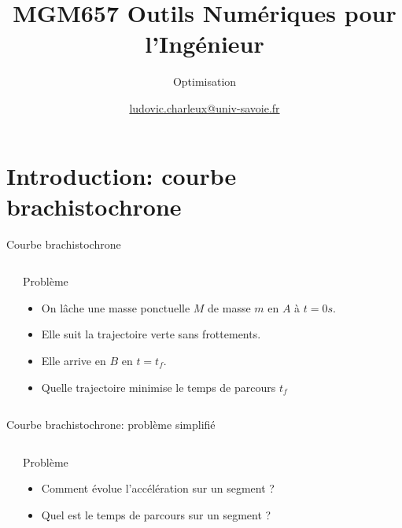 \documentclass[8pt,a4paper]{beamer}
\author[LC]{\href{mailto:ludovic.charleux@univ-savoie.fr}{ludovic.charleux@univ-savoie.fr}}
\title{MGM657 Outils Numériques pour l'Ingénieur}
\subtitle{Optimisation}
\date{}
\institute{\url{www.polytech.univ-savoie.fr}}
\begin{document}
\begin{frame}[plain]
\titlepage
\tableofcontents
\end{frame}

\section{Introduction: courbe brachistochrone}

\begin{frame}{Courbe brachistochrone}
  \begin{columns}
  \begin{center}
   
  \end{center}
  
  \begin{block}{Problème}
  \begin{itemize}
  \item On lâche une masse ponctuelle $M$ de masse $m$ en $A$ à $t=0 s$.
  \item Elle suit la trajectoire verte sans frottements.
  \item Elle arrive en $B$ en $t=t_f$.
  \item Quelle trajectoire minimise le temps de parcours $t_f$
  \end{itemize}
  \end{block}
  \end{columns}
\end{frame}

\begin{frame}{Courbe brachistochrone: problème simplifié}
  \begin{columns}
  \begin{center}
   
  \end{center}
  
  \begin{block}{Problème}
  \begin{itemize}
  \item Comment évolue l'accélération sur un segment ?
  \item Quel est le temps de parcours sur un segment ?
  \end{itemize}
  \end{block}
  \end{columns}
\end{frame}
\end{document}
